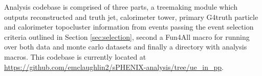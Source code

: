 Analysis codebase is comprised of three parts, a treemaking module which outputs reconstructed and truth jet, calorimeter tower, primary G4truth particle and calorimeter topocluster information from events passing the event selection criteria outlined in Section \ref{sec:selection}, second a Fun4All macro for running over both data and monte carlo datasets and finally a directory with analysis macros. This codebase is currently located at \url{https://github.com/emclaughlin2/sPHENIX-analysis/tree/ue_in_pp}. 